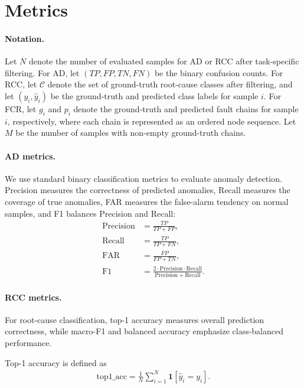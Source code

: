 \documentclass[sigconf,10pt]{acmart} %
\begin{document}
\section{Metrics}\label{appen:metrics}

\paragraph{Notation.}
Let $N$ denote the number of evaluated samples for AD or RCC after task-specific filtering.
For AD, let $(TP, FP, TN, FN)$ be the binary confusion counts.
For RCC, let $\mathcal{C}$ denote the set of ground-truth root-cause classes after filtering, and let $(y_i,\hat{y}_i)$ be the ground-truth and predicted class labels for sample $i$.
For FCR, let $g_i$ and $p_i$ denote the ground-truth and predicted fault chains for sample $i$, respectively, where each chain is represented as an ordered node sequence. Let $M$ be the number of samples with non-empty ground-truth chains.

\paragraph{AD metrics.}
We use standard binary classification metrics to evaluate anomaly detection.
Precision measures the correctness of predicted anomalies, Recall measures the coverage of true anomalies, FAR measures the false-alarm tendency on normal samples, and F1 balances Precision and Recall:
\begin{align}
\mathrm{Precision} &= \frac{TP}{TP+FP},\\
\mathrm{Recall} &= \frac{TP}{TP+FN},\\
\mathrm{FAR} &= \frac{FP}{FP+TN},\\
\mathrm{F1} &= \frac{2\cdot \mathrm{Precision}\cdot \mathrm{Recall}}{\mathrm{Precision}+\mathrm{Recall}}.
\end{align}

\paragraph{RCC metrics.}
For root-cause classification, top-1 accuracy measures overall prediction correctness, while macro-F1 and balanced accuracy emphasize class-balanced performance.

Top-1 accuracy is defined as
\begin{align}
\mathrm{top1\_acc}=\frac{1}{N}\sum_{i=1}^{N}\mathbf{1}[\hat{y}_i=y_i].
\end{align}
\end{document}
